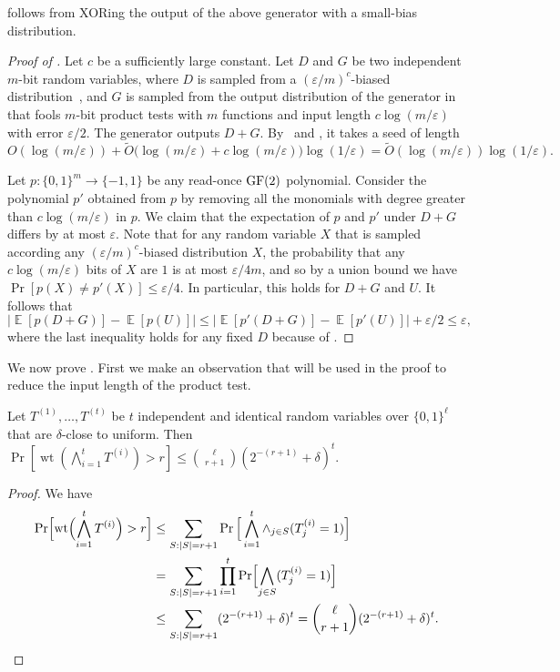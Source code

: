 \documentclass{toc}
\newcommand{\zo}{\{0,1\}}
\def\eps{\varepsilon}
\def\pmone{\{-1, 1\}}
\def\Blocklength{\ell}
\DeclarePairedDelimiter{\abs}{\lvert}{\rvert}
\DeclareMathOperator{\wtt}{wt}  %
\DeclareMathOperator*{\E}{\mathbb{E}}                 %
\begin{document}
	 follows from XORing the output of the above generator with a small-bias distribution.

 \begin{proof}[Proof of {}]
    Let $c$ be a sufficiently large constant.
    Let $D$ and $G$ be two independent $m$-bit random variables, where
    $D$ is 
    sampled from a $(\eps / m)^c$-biased distribution~\cite{NaorN93},
    and $G$ 
    is
    sampled from the output distribution of the generator in  that fools 
    $m$-bit  %
    product tests with $m$ functions and input length $c \log (m/\eps)$ with error $\eps/2$.
		The generator outputs $D + G$.
		By~\cite{NaorN93} and , it takes a seed of length
		\[
			O(\log(m/\eps)) + \tilde O \bigl( \log(m/\eps) + c\log(m/\eps) \bigr) \log(1/\eps)
			= \tilde O(\log(m/\eps)) \log(1/\eps) .
		\]

    Let $p\colon \zo^m \to \pmone$ be any read-once $\textnormal{GF}(2)$ polynomial.
    Consider the polynomial $p'$ obtained from $p$ by removing all the monomials with degree greater than $c \log(m/\eps)$ in $p$.
		We claim that the expectation of $p$ and $p'$ under $D + G$ differs by at most $\eps$.
		Note that for any random variable $X$ that is sampled according any $(\eps/m)^c$-biased distribution $X$, the probability that any $c\log(m/\eps)$ bits of $X$ are $1$ is at most $\eps/4m$, and so by a union bound we have $\Pr[p(X) \neq p'(X)] \le \eps / 4$.
		In particular, this holds for $D + G$ and $U$.
    It follows that 
		\[
			\bigl| \E[p(D + G)] - \E[p(U)] \bigr|
			\le \bigl| \E[p'(D + G)] - \E[p'(U)] \bigr| + \eps / 2
			\le \eps, 
		\]
		where the last inequality holds for any fixed $D$ because of .
  \end{proof}

  We now prove .
  First we
%
make an observation  %
that will be used in the proof to reduce the input length of the product test.
	
	\begin{claim} \label{claim-shrink-termwise}
	  Let $T^{(1)}, \ldots, T^{(t)}$ be $t$ independent and identical random variables over $\zo^\Blocklength$ that are $\delta$-close to uniform.
    Then $\Pr[\wtt(\bigwedge_{i=1}^t T^{(i)}) > r] \le \binom{\Blocklength}{r + 1} (2^{-(r+1)} + \delta)^t$.  %
	\end{claim}
  \begin{proof}%
    We have
		\begin{align*}
      \Pr \Bigl[ \wtt\Bigl(\bigwedge_{i=1}^t T^{(i)}\Bigr) > r \Bigr]
			&\le \sum_{S: \abs{S} = r+1} \Pr \Big[ \bigwedge_{i=1}^t \wedge_{j \in S} (T^{(i)}_j = 1) \Big] \\
			&= \sum_{S: \abs{S} = r+1} \prod_{i=1}^t \Pr \Bigl[ \bigwedge_{j \in S} (T^{(i)}_j = 1) \Bigr] \\
			&\le \sum_{S: \abs{S} = r+1} (2^{-(r+1)} + \delta)^t = \binom{\Blocklength}{r+1} (2^{-(r+1)} + \delta)^t . \qedhere
		\end{align*}
  \end{proof}
\end{document}
